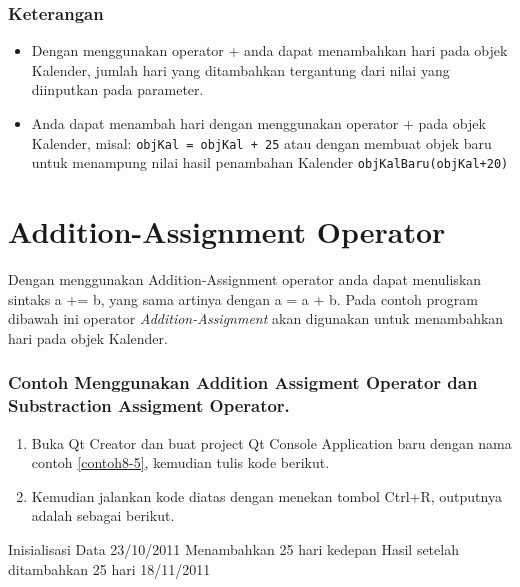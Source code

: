 \subsubsection*{Keterangan}

\begin{itemize}

\item
  Dengan menggunakan operator + anda dapat menambahkan hari pada objek
  Kalender, jumlah hari yang ditambahkan tergantung dari nilai yang
  diinputkan pada parameter.
\item
  Anda dapat menambah hari dengan menggunakan operator + pada objek
  Kalender, misal: \texttt{objKal\ =\ objKal\ +\ 25} atau dengan membuat
  objek baru untuk menampung nilai hasil penambahan Kalender
  \texttt{objKalBaru(objKal+20)}
\end{itemize}

\section{Addition-Assignment
Operator}\label{addition-assignment-operator}

Dengan menggunakan Addition-Assignment operator anda dapat menuliskan
sintaks a += b, yang sama artinya dengan a = a + b. Pada contoh program
dibawah ini operator \emph{Addition-Assignment} akan digunakan untuk
menambahkan hari pada objek Kalender.

\subsubsection*{Contoh  Menggunakan Addition Assigment Operator dan Substraction Assigment Operator.}

\begin{enumerate}

\item
  Buka Qt Creator dan buat project Qt Console Application baru dengan
  nama contoh \ref{contoh8-5}, kemudian tulis kode berikut.




\item
  Kemudian jalankan kode diatas dengan menekan tombol Ctrl+R, outputnya
  adalah sebagai berikut.
\end{enumerate}

\begin{lcverbatim}
Inisialisasi Data
23/10/2011
Menambahkan 25 hari kedepan
Hasil setelah ditambahkan 25 hari
18/11/2011
\end{lcverbatim}

